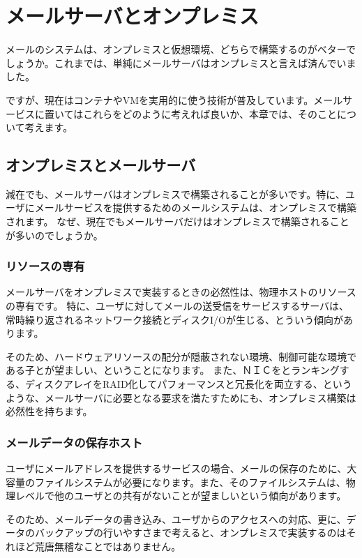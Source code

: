 \chapter{メールサーバとオンプレミス}

メールのシステムは、オンプレミスと仮想環境、どちらで構築するのがベターでしょうか。これまでは、単純にメールサーバはオンプレミスと言えば済んでいました。

ですが、現在はコンテナやVMを実用的に使う技術が普及しています。メールサービスに置いてはこれらをどのように考えれば良いか、本章では、そのことについて考えます。

\section{オンプレミスとメールサーバ}

減在でも、メールサーバはオンプレミスで構築されることが多いです。特に、ユーザにメールサービスを提供するためのメールシステムは、オンプレミスで構築されます。
なぜ、現在でもメールサーバだけはオンプレミスで構築されることが多いのでしょうか。

\subsection{リソースの専有}

メールサーバをオンプレミスで実装するときの必然性は、物理ホストのリソースの専有です。
特に、ユーザに対してメールの送受信をサービスするサーバは、常時繰り返されるネットワーク接続とディスクI/Oが生じる、とういう傾向があります。

そのため、ハードウェアリソースの配分が隠蔽されない環境、制御可能な環境である子とが望ましい、ということになります。
また、ＮＩＣをとランキングする、ディスクアレイをRAID化してパフォーマンスと冗長化を両立する、というような、メールサーバに必要となる要求を満たすためにも、オンプレミス構築は必然性を持ちます。

\subsection{メールデータの保存ホスト}

ユーザにメールアドレスを提供するサービスの場合、メールの保存のために、大容量のファイルシステムが必要になります。また、そのファイルシステムは、物理レベルで他のユーザとの共有がないことが望ましいという傾向があります。

そのため、メールデータの書き込み、ユーザからのアクセスへの対応、更に、データのバックアップの行いやすさまで考えると、オンプレミスで実装するのはそれほど荒唐無稽なことではありません。

